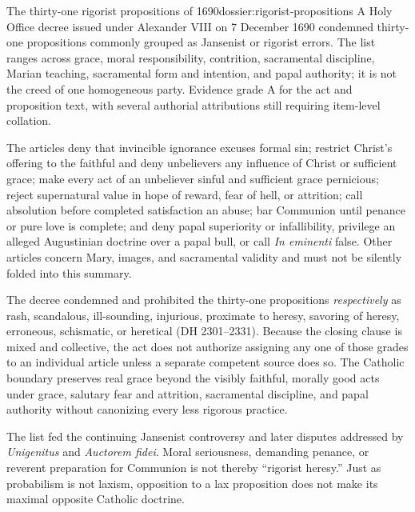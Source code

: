 \begin{heresydossier}{The thirty-one rigorist propositions of 1690}{dossier:rigorist-propositions}
\objectfield A Holy Office decree issued under Alexander VIII on 7 December 1690 condemned thirty-one propositions commonly grouped as Jansenist or rigorist errors. The list ranges across grace, moral responsibility, contrition, sacramental discipline, Marian teaching, sacramental form and intention, and papal authority; it is not the creed of one homogeneous party. Evidence grade A for the act and proposition text, with several authorial attributions still requiring item-level collation.

\propositionfield The articles deny that invincible ignorance excuses formal sin; restrict Christ's offering to the faithful and deny unbelievers any influence of Christ or sufficient grace; make every act of an unbeliever sinful and sufficient grace pernicious; reject supernatural value in hope of reward, fear of hell, or attrition; call absolution before completed satisfaction an abuse; bar Communion until penance or pure love is complete; and deny papal superiority or infallibility, privilege an alleged Augustinian doctrine over a papal bull, or call \emph{In eminenti} false. Other articles concern Mary, images, and sacramental validity and must not be silently folded into this summary.

\responsefield The decree condemned and prohibited the thirty-one propositions \emph{respectively} as rash, scandalous, ill-sounding, injurious, proximate to heresy, savoring of heresy, erroneous, schismatic, or heretical (DH 2301--2331). Because the closing clause is mixed and collective, the act does not authorize assigning any one of those grades to an individual article unless a separate competent source does so. The Catholic boundary preserves real grace beyond the visibly faithful, morally good acts under grace, salutary fear and attrition, sacramental discipline, and papal authority without canonizing every less rigorous practice.

\aftermathfield The list fed the continuing Jansenist controversy and later disputes addressed by \emph{Unigenitus} and \emph{Auctorem fidei}. Moral seriousness, demanding penance, or reverent preparation for Communion is not thereby ``rigorist heresy.'' Just as probabilism is not laxism, opposition to a lax proposition does not make its maximal opposite Catholic doctrine.
\end{heresydossier}

